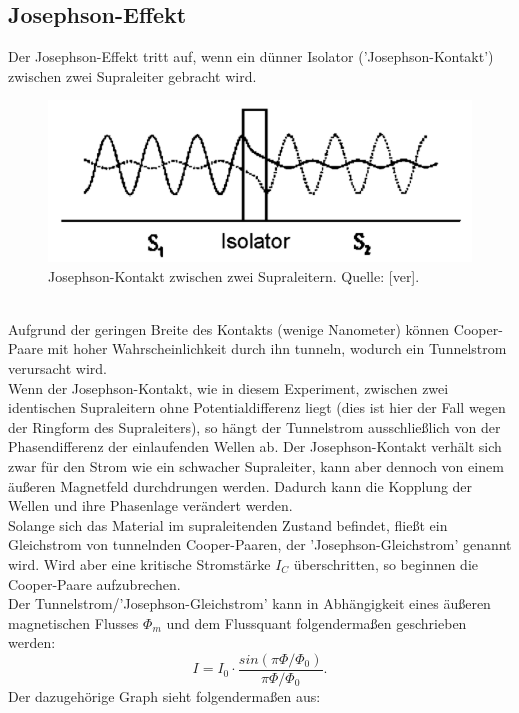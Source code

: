 \subsection{Josephson-Effekt}
Der Josephson-Effekt tritt auf, wenn ein dünner Isolator ('Josephson-Kontakt') zwischen zwei Supraleiter gebracht wird.
\begin{figure}[h]
\begin{center}
\includegraphics[scale=0.6]{Bilder/josephson}
\caption{Josephson-Kontakt zwischen zwei Supraleitern. Quelle: [ver].}
\end{center}
\end{figure}
~\\
Aufgrund der geringen Breite des Kontakts (wenige Nanometer) können Cooper-Paare mit hoher Wahrscheinlichkeit durch ihn tunneln, wodurch ein Tunnelstrom verursacht wird.\\
Wenn der Josephson-Kontakt, wie in diesem Experiment, zwischen zwei identischen Supraleitern ohne Potentialdifferenz liegt (dies ist hier der Fall wegen der Ringform des Supraleiters), so hängt der Tunnelstrom ausschließlich von der Phasendifferenz der einlaufenden Wellen ab. Der Josephson-Kontakt verhält sich zwar für den Strom wie ein schwacher Supraleiter, kann aber dennoch von einem äußeren Magnetfeld durchdrungen werden. Dadurch kann die Kopplung der Wellen und ihre Phasenlage verändert werden. \\
Solange sich das Material im supraleitenden Zustand befindet, fließt ein Gleichstrom von tunnelnden Cooper-Paaren, der 'Josephson-Gleichstrom' genannt wird. Wird aber eine kritische Stromstärke $I_{C}$ überschritten, so beginnen die Cooper-Paare aufzubrechen. \\
Der Tunnelstrom/'Josephson-Gleichstrom' kann in Abhängigkeit eines äußeren magnetischen Flusses $\Phi_{m}$ und dem Flussquant folgendermaßen geschrieben werden:
\[I=I_{0}\cdot\frac{sin(\pi\Phi/\Phi_{0})}{\pi\Phi/\Phi_{0}}.\] 
Der dazugehörige Graph sieht folgendermaßen aus:
